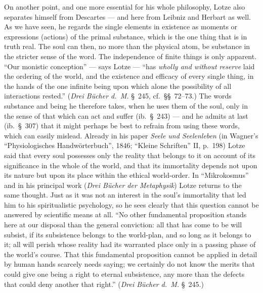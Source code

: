 \documentclass[12pt,a4paper]{book}
\newcommand{\opage}[1]{\marginnote{\footnotesize\textit{[#1]}}}
\begin{document}
On another point, and one more essential for his whole philosophy, Lotze also
separates himself from Descartes --- and here from Leibniz and Herbart as well.
As we have seen, he regards the single elements in existence as moments or
expressions (actions) of the primal substance, which is the one thing that is in
truth real. The soul can then, no more than the physical atom, be substance in
the stricter sense of the word. The independence of finite things is only
apparent. ``Our monistic conception'' --- says Lotze --- ``has \emph{wholly and
without reserve} laid the ordering of the world, and the existence and efficacy
of every single thing, in the hands of the one infinite being upon which alone
the possibility of all interactions rested.'' (\textit{Drei Bücher d.~M.} §~245,
cf.\ §§~72--73.) The words substance and being he therefore takes, when he uses
them of the soul, only in the sense of that which can act and suffer (ib.\
§~243) --- and he admits at last (ib.\ §~307) that it might perhaps be best to
refrain from using these words, which can easily mislead. Already in his paper
\textit{Seele und Seelenleben} (in Wagner's ``Physiologisches Handwörterbuch'',
1846; ``Kleine Schriften'' II, p.~198) Lotze said that every soul possesses only
the reality that belongs to it on account of its significance in the whole of the
world, and that its immortality depends not upon its nature but upon its place
within the ethical world-order. In ``Mikrokosmus'' and in his principal work
(\textit{Drei Bücher der Metaphysik}) Lotze returns to the same thought. Just as
it was not an interest in the soul's immortality that led him to his
spiritualistic psychology, so he sees clearly that this question cannot be
answered by scientific means at all. ``No other fundamental proposition stands
here at our disposal than the general conviction: all that has come to be will
subsist, if its subsistence belongs to the world-plan, and so long as it belongs
to it; \opage{526}all will perish whose reality had its warranted place only in a passing
phase of the world's course. That this fundamental proposition cannot be applied
in detail by human hands scarcely needs saying; we certainly do not know the
merits that could give one being a right to eternal subsistence, any more than
the defects that could deny another that right.'' (\textit{Drei Bücher d.~M.}
§~245.)
\end{document}
